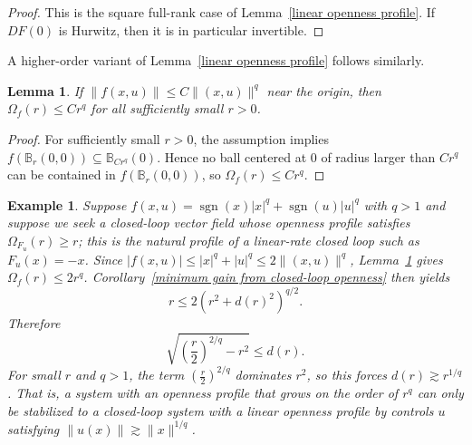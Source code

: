 \documentclass[pdflatex,sn-mathphys-num]{sn-jnl}%
\theoremstyle{thmstyleone}%
\newtheorem{lemma}[theorem]{Lemma}
\theoremstyle{thmstyletwo}%
\newtheorem{example}{Example}%
\theoremstyle{thmstylethree}%
\begin{document}

    \begin{proof}
        This is the square full-rank case of Lemma~\ref{linear openness profile}.  If $DF(0)$ is Hurwitz, then it is in particular invertible.
    \end{proof}


    A higher-order variant of Lemma~\ref{linear openness profile} follows similarly.
    
    \begin{lemma}\label{flat upper profile}
        If $\|f(x,u)\|\leq C\|(x,u)\|^q$ near the origin, then $\Omega_f(r)\leq Cr^q$ for all sufficiently small $r>0$.
    \end{lemma}


    \begin{proof}
        For sufficiently small $r>0$, the assumption implies $f(\mathbb{B}_r(0,0))\subseteq \mathbb{B}_{Cr^q}(0)$.  Hence no ball centered at $0$ of radius larger than $Cr^q$ can be contained in $f(\mathbb{B}_r(0,0))$, so $\Omega_f(r)\leq Cr^q$.
    \end{proof}

    \begin{example}\label{signed polynomial example}
        Suppose $f(x,u)=\operatorname{sgn}(x)|x|^q+\operatorname{sgn}(u)|u|^q$ with $q>1$ and suppose we seek a closed-loop vector field whose openness profile satisfies $\Omega_{F_u}(r) \geq r$; this is the natural profile of a linear-rate closed loop such as $F_u(x)=-x$.  Since $|f(x,u)|\leq |x|^q+|u|^q\leq 2\|(x,u)\|^q$, Lemma~\ref{flat upper profile} gives $\Omega_f(r)\leq 2r^q$.  Corollary~\ref{minimum gain from closed-loop openness} then yields
        \[
            r \leq 2\left(r^2+d(r)^2\right)^{q/2}.
        \]
        Therefore
        \[
            \sqrt{\left(\frac{r}{2}\right)^{2/q}-r^2}\leq d(r).
        \]
        For small $r$ and $q>1$, the term $\left(\frac{r}{2}\right)^{2/q}$ dominates $r^2$, so this forces $d(r) \gtrsim r^{1/q}$.  That is, a system with an openness profile that grows on the order of $r^q$ can only be stabilized to a closed-loop system with a linear openness profile by controls $u$ satisfying $\|u(x)\| \gtrsim \|x\|^{1/q}$.
    \end{example}
    
\end{document}
